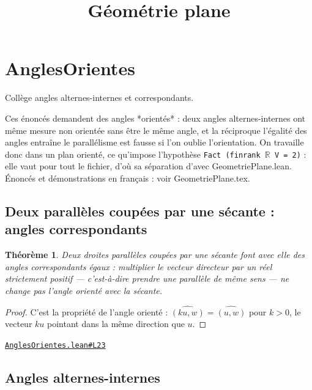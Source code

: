 \documentclass[11pt,a4paper]{article}
\title{Géométrie plane}
\date{}
\theoremstyle{definition}
\theoremstyle{plain}
\newtheorem{theoreme}{Théorème}
\newcommand{\source}[2]{\par\smallskip\noindent\hfill{\footnotesize\href{#1}{\texttt{#2}}}\par\smallskip}
\begin{document}
\maketitle
\sloppy

\section{AnglesOrientes}

\noindent
Collège \textemdash{} angles alternes-internes et correspondants.

Ces énoncés demandent des angles *orientés* : deux angles alternes-internes ont même
mesure non orientée sans être le même angle, et la réciproque \textemdash{} l'égalité des angles
entraîne le parallélisme \textemdash{} est fausse si l'on oublie l'orientation. On travaille donc dans
un plan orienté, ce qu'impose l'hypothèse \texttt{Fact (finrank \(\mathbb{R}\) V = 2)} : elle vaut pour tout
le fichier, d'où sa séparation d'avec GeometriePlane.lean.
Énoncés et démonstrations en français : voir GeometriePlane.tex.

\subsection{Deux parallèles coupées par une sécante : angles correspondants}

\begin{theoreme}
Deux droites parallèles coupées par une sécante font avec elle des \emph{angles
correspondants} égaux : multiplier le vecteur directeur par un réel strictement positif —
c'est-à-dire prendre une parallèle de même sens — ne change pas l'angle orienté avec la
sécante.
\end{theoreme}

\begin{proof}
C'est la propriété de l'angle orienté : $\widehat{(ku, w)} = \widehat{(u, w)}$ pour
$k > 0$, le vecteur $ku$ pointant dans la même direction que $u$.
\end{proof}
\source{https://github.com/Commutator-IO/learn-lean/blob/main/cours/01-college/02-geometrie-plane/AnglesOrientes.lean\#L23}{AnglesOrientes.lean\#L23}

\subsection{Angles alternes-internes}
\end{document}
